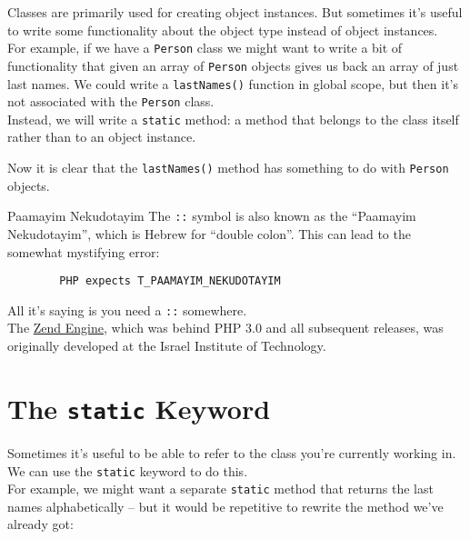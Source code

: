Classes are primarily used for creating object instances. But sometimes it's useful to write some functionality about the object type instead of object instances.
\\

For example, if we have a \texttt{Person} class we might want to write a bit of functionality that given an array of \texttt{Person} objects gives us back an array of just last names. We could write a \texttt{lastNames()} function in global scope, but then it's not associated with the \texttt{Person} class.
\\

Instead, we will write a \texttt{static} method: a method that belongs to the class itself rather than to an object instance.


Now it is clear that the \texttt{lastNames()} method has something to do with \texttt{Person} objects.


\begin{infobox}{Paamayim Nekudotayim}
    The \texttt{::} symbol is also known as the ``Paamayim Nekudotayim'', which is Hebrew for ``double colon''. This can lead to the somewhat mystifying error:

    \begin{verbatim}
        PHP expects T_PAAMAYIM_NEKUDOTAYIM
    \end{verbatim}

    All it's saying is you need a \texttt{::} somewhere.
    \\

    The \href{https://en.wikipedia.org/wiki/Zend_Engine}{Zend Engine}, which was behind PHP 3.0 and all subsequent releases, was originally developed at the Israel Institute of Technology.
\end{infobox}

\section{The \texttt{static} Keyword}

Sometimes it's useful to be able to refer to the class you're currently working in. We can use the \texttt{static} keyword to do this.
\\

For example, we might want a separate \texttt{static} method that returns the last names alphabetically – but it would be repetitive to rewrite the method we've already got:

